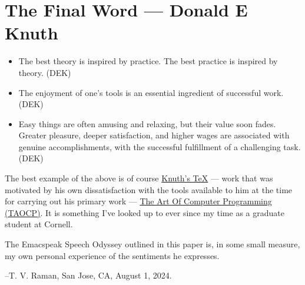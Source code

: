 \documentclass[11pt]{article}
\begin{document}
\section{The Final Word --- Donald E Knuth}
\label{sec:org49814a7}
\begin{itemize}
\item The best theory is inspired by practice. The best practice is
inspired by theory. (DEK)
\item The enjoyment of one's tools is an essential ingredient of
successful work. (DEK)
\item Easy things are often amusing and relaxing, but their value soon
fades. Greater pleasure, deeper satisfaction, and higher wages are
associated with genuine accomplishments, with the successful
fulfillment of a challenging task. (DEK)
\end{itemize}

The best example of the above is of course \href{https://en.wikipedia.org/wiki/TeX}{Knuth's \TeX{}} --- work that
    was motivated  by his own dissatisfaction with the tools available
    to him at the time for carrying out his primary work --- \href{https://www-cs-faculty.stanford.edu/\~knuth/taocp.html}{The Art
    Of Computer Programming (TAOCP)}.  It is something I've looked up
    to ever since my time as a graduate student at Cornell.


The  Emacspeak Speech Odyssey outlined in this paper is, in some
small measure, my own personal
experience of the sentiments he expresses.

--T. V. Raman,  San Jose, CA, August 1, 2024.
\end{document}
